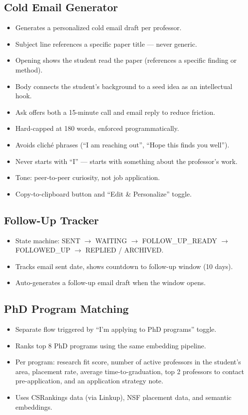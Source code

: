 \documentclass{article}
\begin{document}
\subsection{Cold Email Generator}
\begin{itemize}
  \item Generates a personalized cold email draft per professor.
  \item Subject line references a specific paper title — never generic.
  \item Opening shows the student read the paper (references a specific finding
        or method).
  \item Body connects the student's background to a seed idea as an
        intellectual hook.
  \item Ask offers both a 15-minute call and email reply to reduce friction.
  \item Hard-capped at 180 words, enforced programmatically.
  \item Avoids clich\'{e} phrases (``I am reaching out'', ``Hope this finds you well'').
  \item Never starts with ``I'' — starts with something about the professor's work.
  \item Tone: peer-to-peer curiosity, not job application.
  \item Copy-to-clipboard button and ``Edit \& Personalize'' toggle.
\end{itemize}

\subsection{Follow-Up Tracker}
\begin{itemize}
  \item State machine: SENT $\to$ WAITING $\to$ FOLLOW\_UP\_READY $\to$
        FOLLOWED\_UP $\to$ REPLIED / ARCHIVED.
  \item Tracks email sent date, shows countdown to follow-up window (10 days).
  \item Auto-generates a follow-up email draft when the window opens.
\end{itemize}

\subsection{PhD Program Matching}
\begin{itemize}
  \item Separate flow triggered by ``I'm applying to PhD programs'' toggle.
  \item Ranks top 8 PhD programs using the same embedding pipeline.
  \item Per program: research fit score, number of active professors in the
        student's area, placement rate, average time-to-graduation, top 2
        professors to contact pre-application, and an application strategy note.
  \item Uses CSRankings data (via Linkup), NSF placement data, and semantic
        embeddings.
\end{itemize}
\end{document}
